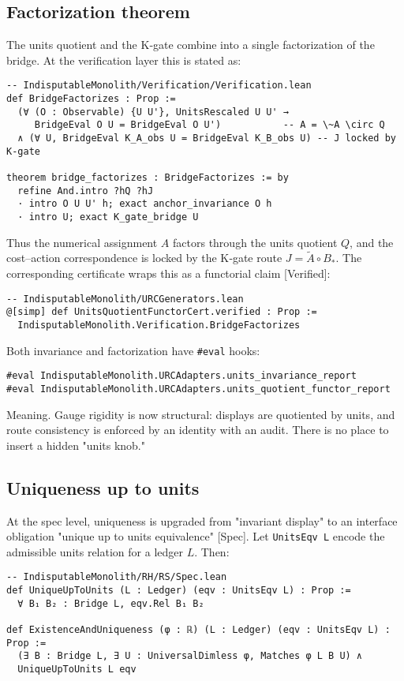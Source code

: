 \documentclass[11pt,a4paper,twoside]{article}
\numberwithin{equation}{section}
\newcommand{\Atilde}{\tilde{A}}
\newcommand{\Bstar}{B_*}
\theoremstyle{customthm}
\theoremstyle{customdef}
\theoremstyle{customrem}
\begin{document}
\subsection{Factorization theorem}

The units quotient and the K‐gate combine into a single factorization of the bridge. At the verification layer this is stated as:
\begin{lstlisting}
-- IndisputableMonolith/Verification/Verification.lean
def BridgeFactorizes : Prop :=
  (∀ (O : Observable) {U U'}, UnitsRescaled U U' →
     BridgeEval O U = BridgeEval O U')           -- A = \~A \circ Q
  ∧ (∀ U, BridgeEval K_A_obs U = BridgeEval K_B_obs U) -- J locked by K‑gate

theorem bridge_factorizes : BridgeFactorizes := by
  refine And.intro ?hQ ?hJ
  · intro O U U' h; exact anchor_invariance O h
  · intro U; exact K_gate_bridge U
\end{lstlisting}

Thus the numerical assignment \(A\) factors through the units quotient \(Q\), and the cost–action correspondence is locked by the K‐gate route \(J=\Atilde\circ \Bstar\). The corresponding certificate wraps this as a functorial claim [Verified]:
\begin{lstlisting}
-- IndisputableMonolith/URCGenerators.lean
@[simp] def UnitsQuotientFunctorCert.verified : Prop :=
  IndisputableMonolith.Verification.BridgeFactorizes
\end{lstlisting}

Both invariance and factorization have \texttt{\#eval} hooks:
\begin{lstlisting}
#eval IndisputableMonolith.URCAdapters.units_invariance_report
#eval IndisputableMonolith.URCAdapters.units_quotient_functor_report
\end{lstlisting}

Meaning. Gauge rigidity is now structural: displays are quotiented by units, and route consistency is enforced by an identity with an audit. There is no place to insert a hidden "units knob."

\subsection{Uniqueness up to units}

At the spec level, uniqueness is upgraded from "invariant display" to an interface obligation "unique up to units equivalence" [Spec]. Let \texttt{UnitsEqv L} encode the admissible units relation for a ledger \(L\). Then:
\begin{lstlisting}
-- IndisputableMonolith/RH/RS/Spec.lean
def UniqueUpToUnits (L : Ledger) (eqv : UnitsEqv L) : Prop :=
  ∀ B₁ B₂ : Bridge L, eqv.Rel B₁ B₂

def ExistenceAndUniqueness (φ : ℝ) (L : Ledger) (eqv : UnitsEqv L) : Prop :=
  (∃ B : Bridge L, ∃ U : UniversalDimless φ, Matches φ L B U) ∧
  UniqueUpToUnits L eqv
\end{lstlisting}
\end{document}
